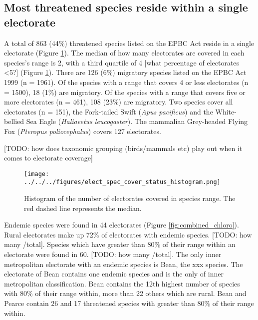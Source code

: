 \documentclass[a4paper,11pt]{article}
\begin{document}
\subsection{Most threatened species reside within a single electorate}

A total of 863 (44\%) threatened species listed on the EPBC Act reside in a single electorate (Figure \ref{fig:hist}). 
The median of how many electorates are covered in each species's range is 2, with a third quartile of 4 [what percentage of electorates <5?] (Figure \ref{fig:hist}). There are 126 (6\%) migratory species listed on the EPBC Act 1999 (n = 1961). 
Of the species with a range that covers 4 or less electorates (n = 1500), 18 (1\%) are migratory. Of the species with a range that covers five or more electorates (n = 461), 108 (23\%) are migratory. Two species cover all electorates (n = 151), the Fork-tailed Swift (\emph{Apus pacificus}) and the White-bellied Sea Eagle (\emph{Haliaeetus leucogaster}). The mammalian Grey-headed Flying Fox (\emph{Pteropus poliocephalus}) covers 127 electorates. 

[TODO: how does taxonomic grouping (birds/mammals etc) play out when it comes to electorate coverage]

\begin{figure}[H]
	\centering
    \texttt{[image: ../../../figures/elect\_spec\_cover\_status\_histogram.png]}
    \caption{Histogram of the number of electorates covered in species range. The red dashed line represents the median.}
    \label{fig:hist}
\end{figure}

Endemic species were found in 44 electorates (Figure \ref{fig:combined_chloro}). Rural electorates make up 72\% of electorates with endemic species. [TODO: how many /total].
Species which have greater than 80\% of their range within an electorate were found in 60. [TODO: how many /total].
The only inner metropolitan electorate with an endemic species is Bean, the xxx species.
The electorate of Bean contains one endemic species and is the only of inner metropolitan classification. Bean contains the 12th highest number of species with 80\% of their range within, more than 22 others which are rural. Bean and Pearce contain 26 and 17 threatened species with greater than 80\% of their range within.
\end{document}
